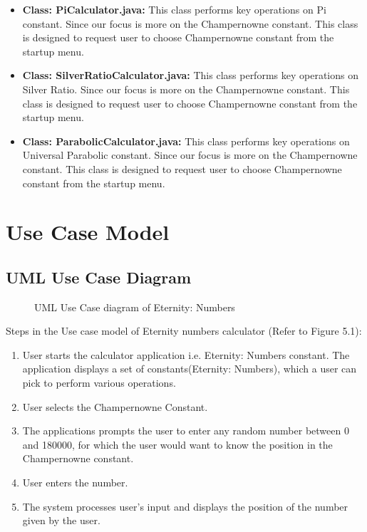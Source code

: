 \documentclass[12pt, a4paper]{report}
\begin{document}
\begin{itemize}
    \item \textbf{Class: PiCalculator.java:} This class performs key operations on Pi constant. Since our focus is more on the Champernowne constant. This class is designed to request user to choose Champernowne constant from the startup menu.
    \item \textbf{Class: SilverRatioCalculator.java:} This class performs key operations on Silver Ratio. Since our focus is more on the Champernowne constant. This class is designed to request user to choose Champernowne constant from the startup menu.
    \item \textbf{Class: ParabolicCalculator.java:} This class performs key operations on Universal Parabolic constant. Since our focus is more on the Champernowne constant. This class is designed to request user to choose Champernowne constant from the startup menu.

\end{itemize}

\chapter{Use Case Model}
\section{UML Use Case Diagram}
\begin{figure}
    \centering
    \caption{UML Use Case diagram of Eternity: Numbers}
    \label{fig:UML Use Case diagram of Eternity: Numbers}
\end{figure}
Steps in the Use case model of Eternity numbers calculator (Refer to Figure 5.1):
\begin{enumerate}

    \item User starts the calculator application i.e. Eternity: Numbers constant. The application displays a set of constants(Eternity: Numbers), which a user can pick to perform various operations.
    \item User selects the Champernowne Constant.
    \item The applications prompts the user to enter any random number between 0 and 180000, for which the user would want to know the position in the Champernowne constant.
    \item User enters the number.
    \item The system processes user's input and displays the position of the number given by the user.
\end{enumerate}
\end{document}

